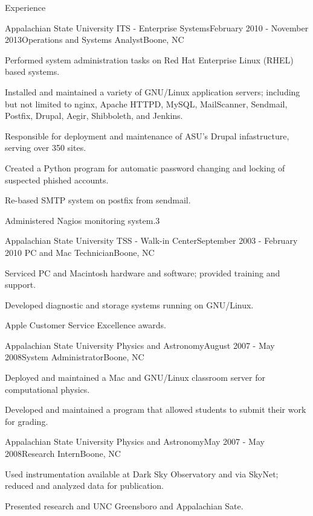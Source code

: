 \documentclass{cv} %
\begin{document}
\begin{rSection}{Experience}
\begin{rSubsection}{Appalachian State University ITS - Enterprise Systems}{February 2010 - November 2013}{Operations and Systems Analyst}{Boone, NC}
\item Performed system administration tasks on Red Hat Enterprise Linux (RHEL) based systems.
\item Installed and maintained a variety of GNU/Linux application servers; including but not limited to nginx, Apache HTTPD, MySQL, MailScanner, Sendmail, Postfix, Drupal, Aegir, Shibboleth, and Jenkins.
\item Responsible for deployment and maintenance of ASU's Drupal infastructure, serving over 350 sites.
\item Created a Python program for automatic password changing and locking of suspected phished accounts.
\item Re-based SMTP system on postfix from sendmail. 
\item Administered Nagios monitoring system.3
\end{rSubsection}


\begin{rSubsection}{Appalachian State University TSS - Walk-in Center}{September 2003 - February 2010
}{PC and Mac Technician}{Boone, NC}
\item Serviced PC and Macintosh hardware and software; provided training and support.
\item Developed diagnostic and storage systems running on GNU/Linux.
\item Apple Customer Service Excellence awards.
\end{rSubsection}

\begin{rSubsection}{Appalachian State University Physics and Astronomy}{August 2007 - May 2008}{System Administrator}{Boone, NC}
\item Deployed and maintained a Mac and GNU/Linux classroom server for computational physics.
\item Developed and maintained a program that allowed students to submit their work for grading.
\end{rSubsection}

\begin{rSubsection}{Appalachian State University Physics and Astronomy}{May 2007 - May 2008}{Research Intern}{Boone, NC}
\item Used instrumentation available at Dark Sky Observatory and via SkyNet; reduced and analyzed data for publication.
\item Presented research and UNC Greensboro and Appalachian Sate.
\end{rSubsection}


\end{rSection}
\end{document}

